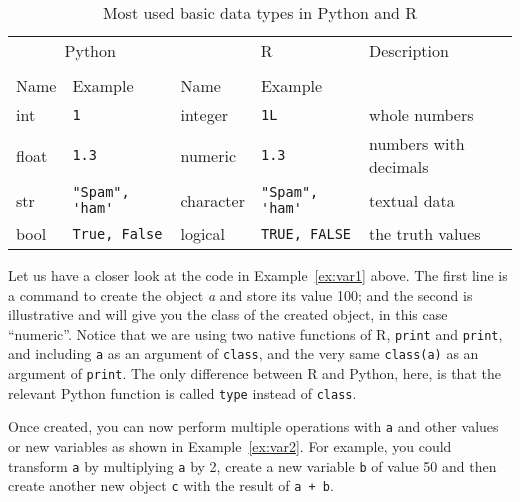 
\begin{table}
  \caption{\label{tab:types}Most used basic data types in Python and R}{
  \begin{tabularx}{\textwidth}{lllll}
    \toprule
    \multicolumn{2}{c}{Python} & \multicolumn{2}{c}{R}& Description \\
    \cmidrule(lr){1-2}    \cmidrule(lr){3-4}\\
    Name & Example & Name & Example \\
    \midrule
    int   & \verb+1+             & integer   & \verb+1L+             & whole numbers \\
    float & \verb+1.3+           & numeric   & \verb+1.3+           & numbers with decimals \\
    str   & \verb+"Spam", 'ham'+ & character & \verb+"Spam", 'ham'+ & textual data  \\
    bool  & \verb+True, False+   & logical   & \verb+TRUE, FALSE+   & the truth values \\
    \bottomrule
  \end{tabularx}}{}
\end{table}
    


Let us have a closer look at the code in Example~\ref{ex:var1} above.
The first line is a command to create the object \emph{a} and store
its value 100; and the second is illustrative and will give you the
class of the created object, in this case ``numeric''. Notice that we
are using two native functions of R, \texttt{print} and \texttt{print}, and
including \verb|a| as an argument of \texttt{class}, and the very same
\texttt{class(a)} as an argument of \texttt{print}. The only difference
between R and Python, here, is that the relevant Python function is
called \texttt{type} instead of \texttt{class}.


Once created, you can now perform multiple operations
with \verb|a| and other values or new variables as shown in Example~\ref{ex:var2}. For example, you
could transform \verb|a| by multiplying \verb|a| by 2, create a new
variable \verb|b| of value 50 and then create another new object
\verb|c| with the result of \verb|a + b|.

